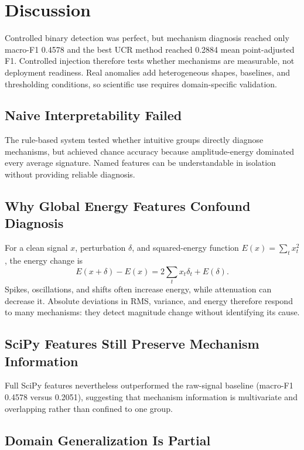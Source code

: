 \section{Discussion}

Controlled binary detection was perfect, but mechanism diagnosis reached only macro-F1 0.4578 and the best UCR method reached 0.2884 mean point-adjusted F1. Controlled injection therefore tests whether mechanisms are measurable, not deployment readiness. Real anomalies add heterogeneous shapes, baselines, and thresholding conditions, so scientific use requires domain-specific validation.

\subsection{Naive Interpretability Failed}

The rule-based system tested whether intuitive groups directly diagnose mechanisms, but achieved chance accuracy because amplitude-energy dominated every average signature. Named features can be understandable in isolation without providing reliable diagnosis.

\subsection{Why Global Energy Features Confound Diagnosis}

For a clean signal \(x\), perturbation \(\delta\), and squared-energy function
\(E(x)=\sum_t x_t^2\), the energy change is
\[
E(x+\delta)-E(x)=2\sum_t x_t\delta_t+E(\delta).
\]
Spikes, oscillations, and shifts often increase energy, while attenuation can decrease it. Absolute deviations in RMS, variance, and energy therefore respond to many mechanisms: they detect magnitude change without identifying its cause.

\subsection{SciPy Features Still Preserve Mechanism Information}

Full SciPy features nevertheless outperformed the raw-signal baseline (macro-F1 0.4578 versus 0.2051), suggesting that mechanism information is multivariate and overlapping rather than confined to one group.

\subsection{Domain Generalization Is Partial}

